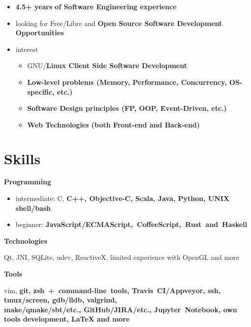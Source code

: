 \begin{itemize}[rightmargin=\dimexpr\linewidth-18cm-\leftmargin\relax]
    \item \bfseries 4.5+ years \mdseries of Software Engineering experience
    \item looking for Free/Libre and \bfseries Open Source \mdseries Software Development Opportunities
    \item interest
    \begin{itemize}
        \item GNU/\bfseries Linux \mdseries Client Side Software Development
        \item \bfseries Low-level \mdseries problems (Memory, Performance, Concurrency, OS-specific, etc.)
        \item \bfseries Software Design \mdseries principles (FP, OOP, Event-Driven, etc.)
        \item \bfseries Web \mdseries Technologies (both Front-end and Back-end)
    \end{itemize}
\end{itemize}

\section*{Skills}

    \bfseries Programming\mdseries
    \begin{itemize}[rightmargin=\dimexpr\linewidth-17.5cm-\leftmargin\relax]
        \item intermediate:
            C,
            \bfseries C++\mdseries,
            Objective-C,
            \bfseries Scala\mdseries,
            Java,
            \bfseries Python\mdseries,
            UNIX shell/\bfseries bash\mdseries
        \item beginner: \bfseries JavaScript/\mdseries ECMAScript,~CoffeeScript,~\bfseries Rust\mdseries~and~Haskell
    \end{itemize}

    \vspace{0.4cm}
    \bfseries Technologies\mdseries

        Qt,
        JNI,
        SQLite,
        udev,
        ReactiveX,
        limited experience with OpenGL and more

    \vspace{0.4cm}
    \bfseries Tools \mdseries
    \begin{adjustwidth}{15pt}{20pt}
        vim,
        \bfseries git\mdseries,
        zsh~+~command-line~tools,
        \bfseries Travis~CI\mdseries/Appveyor,
        ssh,
        tmux/screen,
        \bfseries gdb\mdseries/lldb,
        valgrind,\\
        make/qmake/sbt/etc.,
        \bfseries GitHub\mdseries/JIRA/etc.,
        \bfseries Jupyter~\mdseries Notebook,
        own \bfseries tools development\mdseries,
        {\LaTeX }
        and more
    \end{adjustwidth}

